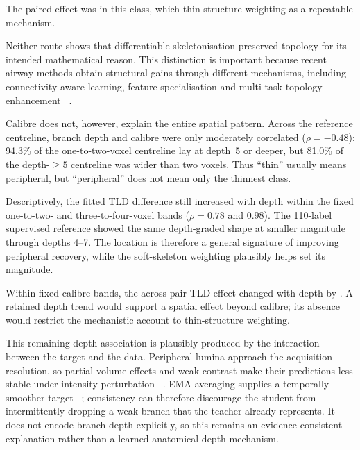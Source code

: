 \ifshowpairedcontrol
\begin{pairedcontrolroute}
The paired effect was  in this class, which
 thin-structure weighting as a repeatable mechanism.
\end{pairedcontrolroute}
\fi

Neither route shows that differentiable skeletonisation preserved topology for its intended
mathematical reason. This distinction is important because
recent airway methods obtain structural gains through different mechanisms, including
connectivity-aware learning, feature specialisation and multi-task topology enhancement
~\cite{qin2019airwaynet,gu2023featurespecialisation,yang2024topoenhance}.

Calibre does not, however, explain the entire spatial pattern. Across the reference centreline,
branch depth and calibre were only moderately correlated ($\rho=-0.48$): 94.3\% of the
one-to-two-voxel centreline lay at depth~5 or deeper, but 81.0\% of the depth-$\geq5$ centreline
was wider than two voxels. Thus ``thin'' usually means peripheral, but ``peripheral'' does not
mean only the thinnest class.

\ifshowcurrentcontrol
\begin{currentcontrolroute}
Descriptively, the fitted TLD difference still increased with depth within the fixed
one-to-two- and three-to-four-voxel bands ($\rho=0.78$ and $0.98$). The 110-label supervised
reference showed the same depth-graded shape at smaller magnitude through depths 4--7. The
location is therefore a general signature of improving peripheral recovery, while the
soft-skeleton weighting plausibly helps set its magnitude.
\end{currentcontrolroute}
\fi

\ifshowpairedcontrol
\begin{pairedcontrolroute}
Within fixed calibre bands, the across-pair TLD effect changed with depth by \pending. A retained
depth trend would support a spatial effect beyond calibre; its absence would restrict the
mechanistic account to thin-structure weighting.
\end{pairedcontrolroute}
\fi

This remaining depth association is plausibly produced by the interaction between the target and
the data. Peripheral lumina approach the acquisition resolution, so partial-volume effects and
weak contrast make their predictions less stable under intensity perturbation
~\cite{montaudon2007,GarciaUceda2021AirwayCNN}. EMA averaging supplies a temporally smoother target
~\cite{tarvainen2017mean,laine2017temporal,yu2019uamt}; consistency can therefore discourage the
student from intermittently dropping a weak branch that the teacher already represents. It does
not encode branch depth explicitly, so this remains an evidence-consistent explanation rather
than a learned anatomical-depth mechanism.

